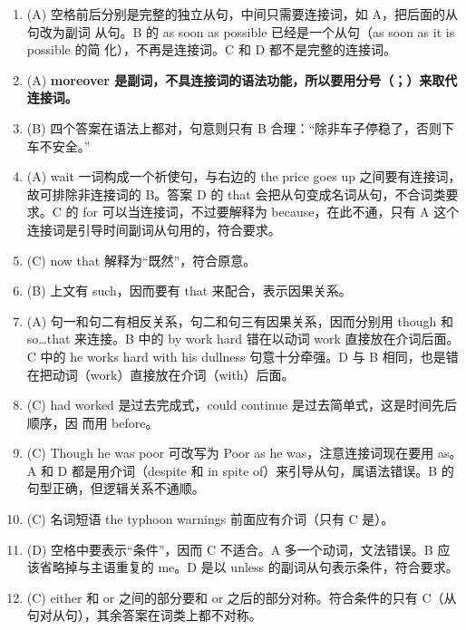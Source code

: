 \begin{enumerate}

\item (A) 空格前后分别是完整的独立从句，中间只需要连接词，如 A，把后面的从句改为副词
  从句。B 的 as soon as possible 已经是一个从句（as soon as it is possible 的简
  化），不再是连接词。C 和 D 都不是完整的连接词。

\item (A) \textbf{moreover 是副词，不具连接词的语法功能，所以要用分号（；）来取代连接词。}

\item (B) 四个答案在语法上都对，句意则只有 B 合理：“除非车子停稳了，否则下车不安全。”

\item (A) wait 一词构成一个祈使句，与右边的 the price goes up 之间要有连接词，故可排除非连接词的 B。答案 D 的 that 会把从句变成名词从句，不合词类要求。C 的 for 可以当连接词，不过要解释为 because，在此不通，只有 A 这个连接词是引导时间副词从句用的，符合要求。

\item (C) now that 解释为“既然”，符合原意。

\item (B) 上文有 such，因而要有 that 来配合，表示因果关系。

\item (A) 句一和句二有相反关系，句二和句三有因果关系，因而分别用 though 和 so…that 来连接。B 中的 by work hard 错在以动词 work 直接放在介词后面。C 中的 he works hard with his dullness 句意十分牵强。D 与 B 相同，也是错在把动词（work）直接放在介词（with）后面。

\item (C) had worked 是过去完成式，could continue 是过去简单式，这是时间先后顺序，因
  而用 before。

\item  (C) Though he was poor 可改写为 Poor as he was，注意连接词现在要用 as。A 和 D 都是用介词（despite 和 in spite of）来引导从句，属语法错误。B 的句型正确，但逻辑关系不通顺。

\item (C) 名词短语 the typhoon warnings 前面应有介词（只有 C 是）。

\item  (D) 空格中要表示“条件”，因而 C 不适合。A 多一个动词，文法错误。B 应该省略掉与主语重复的 me。D 是以 unless 的副词从句表示条件，符合要求。

\item  (C) either 和 or 之间的部分要和 or 之后的部分对称。符合条件的只有 C（从句对从句），其余答案在词类上都不对称。


\end{enumerate}
